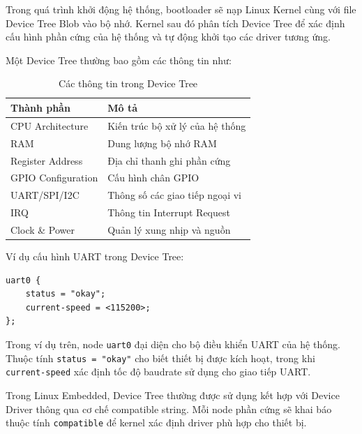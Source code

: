 Trong quá trình khởi động hệ thống, bootloader sẽ nạp Linux Kernel cùng với file Device Tree Blob vào bộ nhớ. Kernel sau đó phân tích Device Tree để xác định cấu hình phần cứng của hệ thống và tự động khởi tạo các driver tương ứng.

Một Device Tree thường bao gồm các thông tin như:
\begin{table}[H]
\centering

\begin{tabular}{|l|l|}
\hline
\textbf{Thành phần} & \textbf{Mô tả} \\ \hline

CPU Architecture &
Kiến trúc bộ xử lý của hệ thống \\ \hline

RAM &
Dung lượng bộ nhớ RAM \\ \hline

Register Address &
Địa chỉ thanh ghi phần cứng \\ \hline

GPIO Configuration &
Cấu hình chân GPIO \\ \hline

UART/SPI/I2C &
Thông số các giao tiếp ngoại vi \\ \hline

IRQ &
Thông tin Interrupt Request \\ \hline

Clock \& Power &
Quản lý xung nhịp và nguồn \\ \hline

\end{tabular}
\caption{Các thông tin trong Device Tree}
\label{tab:device_tree_info}
\end{table}

Ví dụ cấu hình UART trong Device Tree:

\begin{verbatim}
uart0 {
    status = "okay";
    current-speed = <115200>;
};
\end{verbatim}

Trong ví dụ trên, node \texttt{uart0} đại diện cho bộ điều khiển UART của hệ thống. Thuộc tính \texttt{status = "okay"} cho biết thiết bị được kích hoạt, trong khi \texttt{current-speed} xác định tốc độ baudrate sử dụng cho giao tiếp UART.

Trong Linux Embedded, Device Tree thường được sử dụng kết hợp với Device Driver thông qua cơ chế compatible string. Mỗi node phần cứng sẽ khai báo thuộc tính \texttt{compatible} để kernel xác định driver phù hợp cho thiết bị.

